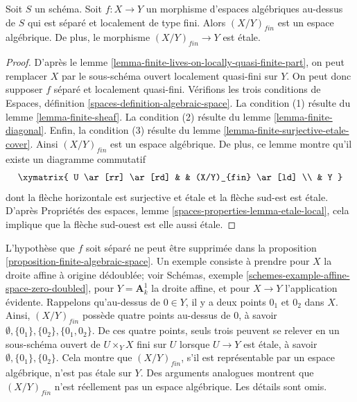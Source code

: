 \begin{proposition}
\label{proposition-finite-algebraic-space}
Soit $S$ un schéma.
Soit $f : X \to Y$ un morphisme d'espaces algébriques au-dessus de $S$ qui
est séparé et localement de type fini. Alors $(X/Y)_{fin}$
est un espace algébrique. De plus, le morphisme
$(X/Y)_{fin} \to Y$ est étale.
\end{proposition}

\begin{proof}
D'après le
lemme \ref{lemma-finite-lives-on-locally-quasi-finite-part},
on peut remplacer $X$ par le sous-schéma ouvert localement quasi-fini
sur $Y$. On peut donc supposer $f$ séparé et localement quasi-fini.
Vérifions les trois conditions de
Espaces, définition \ref{spaces-definition-algebraic-space}.
La condition (1) résulte du
lemme \ref{lemma-finite-sheaf}.
La condition (2) résulte du
lemme \ref{lemma-finite-diagonal}.
Enfin, la condition (3) résulte du
lemme \ref{lemma-finite-surjective-etale-cover}.
Ainsi $(X/Y)_{fin}$ est un espace algébrique.
De plus, ce lemme montre qu'il existe un
diagramme commutatif
$$
\xymatrix{
U \ar[rr] \ar[rd] & & (X/Y)_{fin} \ar[ld] \\
& Y
}
$$
dont la flèche horizontale est surjective et étale et la flèche sud-est
est étale. D'après
Propriétés des espaces, lemme \ref{spaces-properties-lemma-etale-local},
cela implique que la flèche sud-ouest est elle aussi étale.
\end{proof}

\begin{remark}
\label{remark-warning}
L'hypothèse que $f$ soit séparé ne peut être supprimée dans la
proposition \ref{proposition-finite-algebraic-space}.
Un exemple consiste à prendre pour $X$ la droite affine à origine dédoublée; voir
Schémas, exemple \ref{schemes-example-affine-space-zero-doubled},
pour $Y = \mathbf{A}^1_k$ la droite affine, et pour $X \to Y$ l'application évidente.
Rappelons qu'au-dessus de $0 \in Y$, il y a deux points $0_1$ et $0_2$
dans $X$. Ainsi, $(X/Y)_{fin}$ possède quatre points au-dessus de $0$, à savoir
$\emptyset, \{0_1\}, \{0_2\}, \{0_1, 0_2\}$.
De ces quatre points, seuls trois peuvent se relever en un sous-schéma ouvert
de $U \times_Y X$ fini sur $U$ lorsque $U \to Y$ est étale,
à savoir $\emptyset, \{0_1\}, \{0_2\}$. Cela montre que $(X/Y)_{fin}$,
s'il est représentable par un espace algébrique, n'est pas étale sur $Y$.
Des arguments analogues montrent que $(X/Y)_{fin}$ n'est réellement pas un espace
algébrique. Les détails sont omis.
\end{remark}

